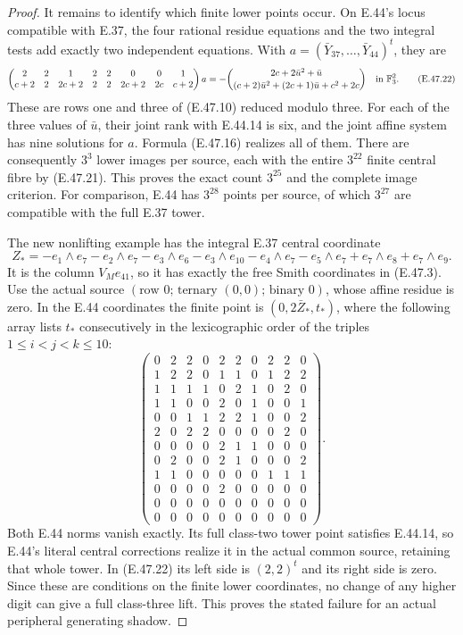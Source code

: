 \begin{proof}
It remains to identify which finite lower
points occur.  On E.44's locus compatible
with E.37, the four rational residue equations
and the two integral tests add exactly two
independent equations.  With
$a=(\bar Y_{37},\ldots,\bar Y_{44})^t$, they are
\[
 \begin{pmatrix}
 2&2&1&2&2&0&0&1\\
 c+2&2&2c+2&2&2&2c+2&2c&c+2
 \end{pmatrix}a
 =-\binom{2c+2\bar u^2+\bar u}
 {(c+2)\bar u^2+(2c+1)\bar u+c^2+2c}
                   \quad\hbox{in }\mathbb F_3^2.
 \tag{E.47.22}
\]
These are rows one and three of
\textup{(E.47.10)} reduced modulo three.
For each of the three values of $\bar u$,
their joint rank with E.44.14 is six, and the
joint affine system has nine solutions for
$a$.  Formula \textup{(E.47.16)} realizes all
of them.  There are consequently $3^3$ lower
images per source, each with the entire
$3^{22}$ finite central fibre by
\textup{(E.47.21)}.  This proves the exact
count $3^{25}$ and the complete image criterion.
For comparison, E.44 has $3^{28}$ points per
source, of which $3^{27}$ are compatible with
the full E.37 tower.

The new nonlifting example has the integral
E.37 central coordinate
\[
 Z_*=-e_1\wedge e_7-e_2\wedge e_7-e_3\wedge e_6
       -e_3\wedge e_{10}-e_4\wedge e_7-e_5\wedge e_7
       +e_7\wedge e_8+e_7\wedge e_9.
 \tag{E.47.23}
\]
It is the column $V_Me_{41}$, so it has exactly
the free Smith coordinates in
\textup{(E.47.3)}.  Use the actual source
$(\text{row }0;\,\text{ternary }(0,0);\,\text{binary }0)$,
whose affine residue is zero.
In the E.44 coordinates the finite point is
$(0,2\bar Z_*,t_*)$, where the following array
lists $t_*$ consecutively in the lexicographic
order of the triples $1\leq i<j<k\leq10$:
\[
\begin{pmatrix}
0&2&2&0&2&2&0&2&2&0\\
1&2&2&0&1&1&0&1&2&2\\
1&1&1&1&0&2&1&0&2&0\\
1&1&0&0&2&0&1&0&0&1\\
0&0&1&1&2&2&1&0&0&2\\
2&0&2&2&0&0&0&0&2&0\\
0&0&0&0&2&1&1&0&0&0\\
0&2&0&0&2&1&0&0&0&2\\
1&1&0&0&0&0&0&1&1&1\\
0&0&0&0&2&0&0&0&0&0\\
0&0&0&0&0&0&0&0&0&0\\
0&0&0&0&0&0&0&0&0&0
\end{pmatrix}.
 \tag{E.47.24}
\]
Both E.44 norms vanish exactly.  Its full
class-two tower point satisfies E.44.14,
so E.44's literal central corrections realize
it in the actual common source, retaining
that whole tower.  In \textup{(E.47.22)} its
left side is $(2,2)^t$ and its right side is
zero.  Since these are conditions on the
finite lower coordinates, no change of any
higher digit can give a full class-three lift.
This proves the stated failure for an actual
peripheral generating shadow.


\end{proof}
